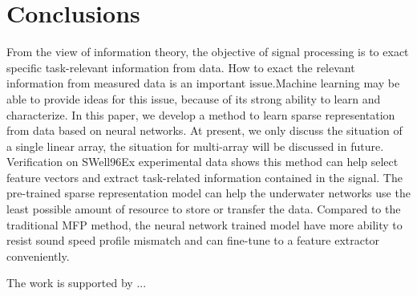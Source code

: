 \section{Conclusions}
From the view of information theory, the objective of signal processing is to exact specific task-relevant information from data.
How to exact the relevant information from measured data is an important issue.Machine learning may be able to provide ideas for this issue, because of its strong ability to learn and characterize.
In this paper, we develop a method to learn sparse representation from data based on neural networks. At present, we only discuss the situation of a single linear array, the situation for multi-array will be discussed in future.
Verification on SWell96Ex experimental data shows this method can help select feature vectors and extract task-related information contained in the signal. The pre-trained sparse representation model can help the underwater networks use the least possible amount of resource to store or transfer the data. Compared to the traditional MFP method, the neural network trained model have more ability to resist sound speed profile mismatch and can fine-tune to a feature extractor conveniently.

\begin{acks}
The work is supported by ...

\end{acks}
